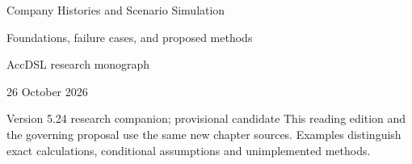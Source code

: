 \documentclass[11pt,a4paper]{report}
\begin{document}
\hypersetup{pageanchor=false}
\begin{titlepage}
{\Huge Company Histories and Scenario Simulation\par}
\vspace{12mm}
{\Large Foundations, failure cases, and proposed methods\par}
\vspace{8mm}
AccDSL research monograph\par 26 October 2026\par Version 5.24 research companion; provisional candidate
\vfill
This reading edition and the governing proposal use the same new chapter sources. Examples distinguish exact calculations, conditional assumptions and unimplemented methods.
\end{titlepage}
\hypersetup{pageanchor=true}
\tableofcontents
\clearpage{}


























\clearpage\label{sim:body-end}

\begingroup\raggedright
\endgroup
\end{document}
